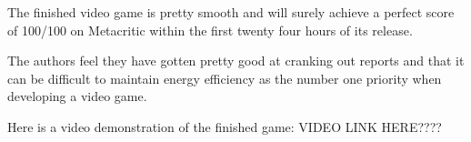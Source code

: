 The finished video game is pretty smooth and will surely achieve a perfect score of 100/100 on Metacritic within the first twenty four hours of its release.

The authors feel they have gotten pretty good at cranking out reports and that it can be difficult to maintain energy efficiency as the number one priority when developing a video game.

Here is a video demonstration of the finished game: VIDEO LINK HERE????